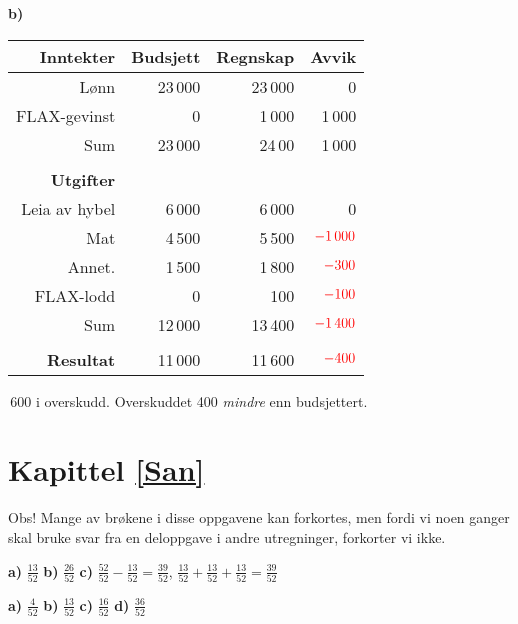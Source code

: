 \textbf{b)}\\
\begin{tabular}{r r r r}
	\textbf{Inntekter} & Budsjett & Regnskap & Avvik \\ \hline 
	Lønn & 23\,000 & 23\,000 & 0\\
	FLAX-gevinst & 0& 1\,000 & 1\,000\\ \hline
	Sum & 23\,000 & 24\,00 & 1\,000\\\hline 
	& \\
	\textbf{Utgifter} & \\ \hline
	Leia av hybel & 6\,000 & 6\,000 &0 \\
	Mat & 4\,500 & 5\,500 & $ \color{red}-1\,000 $\\
	Annet. & 1\,500 & 1\,800 & $ \color{red}-300 $\\ 
	FLAX-lodd & 0 & 100 & $ \color{red}-100 $ \\
	\hline
	Sum & 12\,000 & 13\,400 & $ \color{red}-1\,400 $\\ \hline
	& \\ \hline
	\textbf{Resultat} & 11\,000 & 11\,600 & $ \color{red}-400 $ \\ \hline
\end{tabular}\,600 i overskudd. Overskuddet 400 \textsl{mindre} enn budsjettert.

\section*{Kapittel \ref*{San}}
Obs! Mange av brøkene i disse oppgavene kan forkortes, men fordi vi noen ganger skal bruke svar fra en deloppgave i andre utregninger, forkorter vi ikke. \vsk

\textbf{a)} $ \frac{13}{52}$
\textbf{b)} $ \frac{26}{52} $
\textbf{c)} $ \frac{52}{52}-\frac{13}{52}=\frac{39}{52} $, $ \frac{13}{52}+\frac{13}{52}+\frac{13}{52}=\frac{39}{52} $

\textbf{a)} $ \frac{4}{52} $ 
\textbf{b)} $ \frac{13}{52} $
\textbf{c)} $ \frac{16}{52} $
\textbf{d)} $ \frac{36}{52} $


